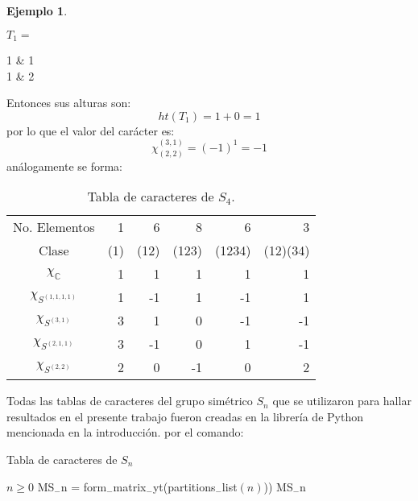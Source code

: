 \documentclass[12pt]{book}
\theoremstyle{definition}
\newtheorem{example}[theorem]{Ejemplo}
\newcounter{in}
\begin{document}
\begin{example}
\begin{center}
  $T_1=$
  \begin{ytableau}
    1 & 1  \\
    1 & 2
  \end{ytableau}\qquad
\end{center}
Entonces sus alturas son:
$$ht(T_1) = 1 + 0 = 1$$
por lo que el valor del carácter es:
$$\chi_{(2,2)}^{(3,1)} = (-1)^{1} = -1$$
análogamente se forma:
\begin{table}[htpb]
  \centering
  \begin{tabular}{c|r r r r r}
    No. Elementos & 1 & 6 & 8 & 6 & 3 \\
    Clase & (1) & (12) & (123) & (1234) &(12)(34)\\
    \hline
    $\chi_{\mathbb{C}}$ & 1 & 1 & 1 & 1 & 1 \\
    $\chi_{S^{(1,1,1,1)}}$ & 1 & -1 & 1 & -1 & 1\\
    $\chi_{S^{(3,1)}}$ & 3 & 1 & 0 & -1 & -1\\
    $\chi_{S^{(2,1,1)}}$ & 3 & -1 & 0 & 1 & -1 \\
    $\chi_{S^{(2,2)}}$ & 2 & 0 & -1 & 0 & 2 
\end{tabular}
    \caption{Tabla de caracteres de $S_{4}$.}
\label{tab:S_4}
\end{table}
\end{example}
Todas las tablas de caracteres del grupo simétrico $S_n$ que se
utilizaron para hallar resultados en el presente trabajo fueron
creadas en la librería de Python mencionada en la introducción.
por el comando:
\begin{algorithm}[H]
\caption{Tabla de caracteres de $S_n$}
\begin{algorithmic}
\REQUIRE $n \geq 0$
\STATE MS$_{-}$n = form$_{-}$matrix$_{-}$yt(partitions$_{-}$list$(n)$))
\PRINT MS$_{-}$n
\end{algorithmic}
\end{algorithm}
\end{document}
